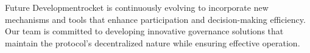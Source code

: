 \begin{mfai-box-scale}{Future Development}{rocket}
 is continuously evolving to incorporate new mechanisms and tools that enhance participation and decision-making efficiency. Our team is committed to developing innovative governance solutions that maintain the protocol's decentralized nature while ensuring effective operation.
\end{mfai-box-scale}

\newpage 